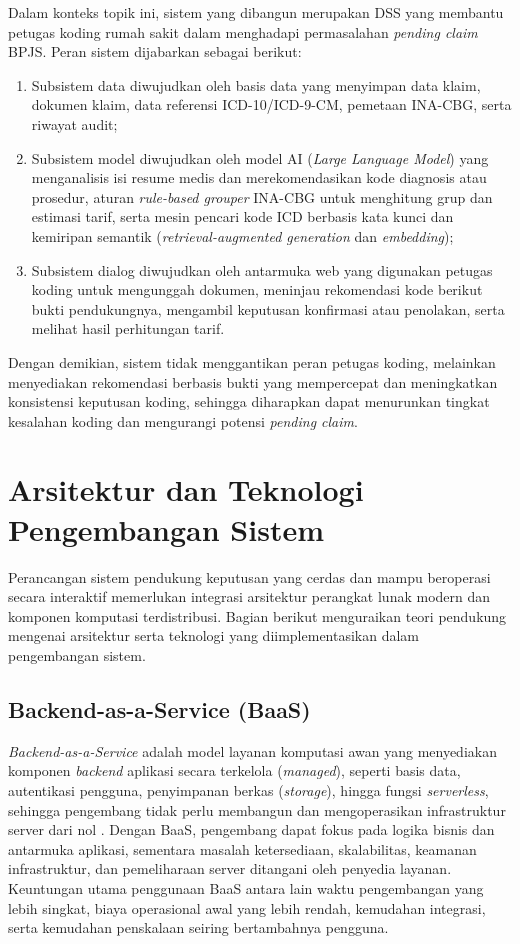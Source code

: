 Dalam konteks topik ini, sistem yang dibangun merupakan DSS yang membantu petugas koding rumah sakit dalam menghadapi permasalahan \textit{pending claim} BPJS. Peran sistem dijabarkan sebagai berikut:
\begin{enumerate}
    \item Subsistem data diwujudkan oleh basis data yang menyimpan data klaim, dokumen klaim, data referensi ICD-10/ICD-9-CM, pemetaan INA-CBG, serta riwayat audit;
    \item Subsistem model diwujudkan oleh model AI (\textit{Large Language Model}) yang menganalisis isi resume medis dan merekomendasikan kode diagnosis atau prosedur, aturan \textit{rule-based grouper} INA-CBG untuk menghitung grup dan estimasi tarif, serta mesin pencari kode ICD berbasis kata kunci dan kemiripan semantik (\textit{retrieval-augmented generation} dan \textit{embedding});
    \item Subsistem dialog diwujudkan oleh antarmuka web yang digunakan petugas koding untuk mengunggah dokumen, meninjau rekomendasi kode berikut bukti pendukungnya, mengambil keputusan konfirmasi atau penolakan, serta melihat hasil perhitungan tarif.
\end{enumerate}

Dengan demikian, sistem tidak menggantikan peran petugas koding, melainkan menyediakan rekomendasi berbasis bukti yang mempercepat dan meningkatkan konsistensi keputusan koding, sehingga diharapkan dapat menurunkan tingkat kesalahan koding dan mengurangi potensi \textit{pending claim}.

\section{Arsitektur dan Teknologi Pengembangan Sistem}
Perancangan sistem pendukung keputusan yang cerdas dan mampu beroperasi secara interaktif memerlukan integrasi arsitektur perangkat lunak modern dan komponen komputasi terdistribusi. Bagian berikut menguraikan teori pendukung mengenai arsitektur serta teknologi yang diimplementasikan dalam pengembangan sistem.

\subsection{Backend-as-a-Service (BaaS)}
\textit{Backend-as-a-Service} adalah model layanan komputasi awan yang menyediakan komponen \textit{backend} aplikasi secara terkelola (\textit{managed}), seperti basis data, autentikasi pengguna, penyimpanan berkas (\textit{storage}), hingga fungsi \textit{serverless}, sehingga pengembang tidak perlu membangun dan mengoperasikan infrastruktur server dari nol \cite{25}. Dengan BaaS, pengembang dapat fokus pada logika bisnis dan antarmuka aplikasi, sementara masalah ketersediaan, skalabilitas, keamanan infrastruktur, dan pemeliharaan server ditangani oleh penyedia layanan. Keuntungan utama penggunaan BaaS antara lain waktu pengembangan yang lebih singkat, biaya operasional awal yang lebih rendah, kemudahan integrasi, serta kemudahan penskalaan seiring bertambahnya pengguna.

